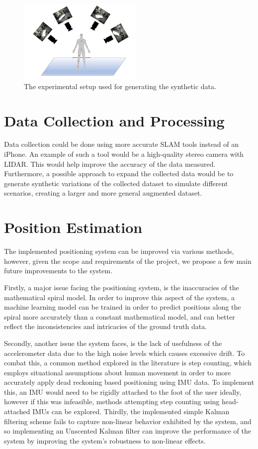 \begin{figure}[h] 
	\centering \includegraphics[height=4cm]{./images/setupsynth.png}
	\caption{The experimental setup used for generating the synthetic data.}
	\label{setup_synthdata}
\end{figure}

\section{Data Collection and Processing}
Data collection could be done using more accurate SLAM tools instead of an iPhone. An example of such a tool would be a high-quality stereo camera with LIDAR. This would help improve the accuracy of the data measured. Furthermore, a possible approach to expand the collected data would be to generate synthetic variations of the collected dataset to simulate different scenarios, creating a larger and more general augmented dataset.


\section{Position Estimation}
The implemented positioning system can be improved via various methods, however, given the scope and requirements of the project, we propose a few main future improvements to the system. 

Firstly, a major issue facing the positioning system, is the inaccuracies of the mathematical spiral model. In order to improve this aspect of the system, a machine learning model can be trained in order to predict positions along the spiral more accurately than a constant mathematical model, and can better reflect the inconsistencies and intricacies of the ground truth data.

Secondly, another issue the system faces, is the lack of usefulness of the accelerometer data due to the high noise levels which causes excessive drift. To combat this, a common method explored in the literature is step counting, which employs situational assumptions about human movement in order to more accurately apply dead reckoning based positioning using IMU data. To implement this, an IMU would need to be rigidly attached to the foot of the user ideally, however if this was infeasible, methods attempting step counting using head-attached IMUs can be explored. \cite{huang_2022_improvement, tiwari_2022_a}
Thirdly, the implemented simple Kalman filtering scheme fails to capture non-linear behavior exhibited by the system, and so implementing an Unscented Kalman filter \cite{bernalpolo_2019_kalman} can improve the performance of the system by improving the system's robustness to non-linear effects.


